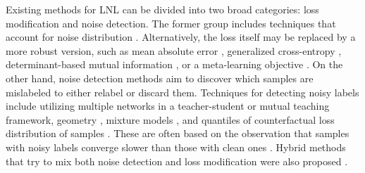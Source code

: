 \documentclass[10pt,twocolumn,letterpaper]{article}
\renewcommand{\cite}[1]{\citep{#1}}
\begin{document}
Existing methods for LNL can be divided into two broad categories: loss modification and noise detection.  The former group includes techniques that account for noise distribution \cite{patrini2017making,xiaobo2019anchor,yao2020dual}. Alternatively, the loss itself may be replaced by a more robust version, such as mean absolute error \cite{ghost2017mae}, generalized cross-entropy \cite{zhang2018generalized}, determinant-based mutual information \cite{xu2019ldmi}, or a meta-learning objective \cite{li2019learning}. On the other hand, noise detection methods aim to discover which samples are mislabeled to either relabel or discard them. Techniques for detecting noisy labels include utilizing multiple networks in a teacher-student \cite{jiang2018mentornet} or mutual teaching \cite{han2018coteaching,yu19coteachingplus} framework, geometry \cite{han2019deepself}, mixture models \cite{arazo2019mcorr,li2020dividemix}, and quantiles of counterfactual loss distribution of samples \cite{song2020robust}. These are often based on the observation that samples with noisy labels converge slower than those with clean ones \cite{arpit2017closer,cicek2018speedas,li2019gradient,pleiss2020identifying}. Hybrid methods that try to mix both noise detection and loss modification were also proposed \cite{song2019selfie,liu2020earlylearning}.
\end{document}
